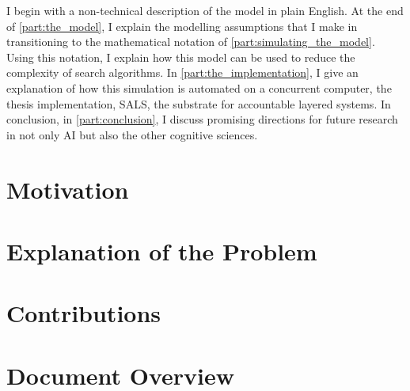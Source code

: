 I begin with a non-technical description of the model in plain
English.  At the end of \autoref{part:the_model}, I explain the
modelling assumptions that I make in transitioning to the mathematical
notation of \autoref{part:simulating_the_model}.  Using this notation,
I explain how this model can be used to reduce the complexity of
search algorithms.  In \autoref{part:the_implementation}, I give an
explanation of how this simulation is automated on a concurrent
computer, the thesis implementation, SALS, the substrate for
accountable layered systems.  In conclusion, in
\autoref{part:conclusion}, I discuss promising directions for future
research in not only AI but also the other cognitive sciences.

\section{Motivation}

\section{Explanation of the Problem}

\section{Contributions}

\section{Document Overview}

